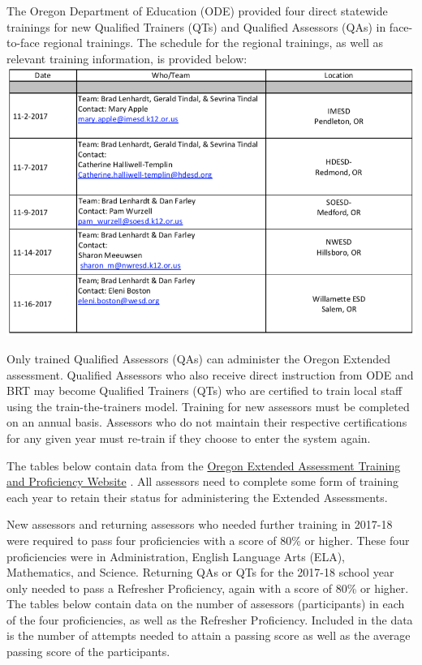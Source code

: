 \documentclass[]{article}
\begin{document}
The Oregon Department of Education (ODE) provided four direct statewide
trainings for new Qualified Trainers (QTs) and Qualified Assessors (QAs)
in face-to-face regional trainings. The schedule for the regional
trainings, as well as relevant training information, is provided below:
\FloatBarrier
\includegraphics{Figures/TrainingSched/TraingSched.png}

Only trained Qualified Assessors (QAs) can administer the Oregon
Extended assessment. Qualified Assessors who also receive direct
instruction from ODE and BRT may become Qualified Trainers (QTs) who are
certified to train local staff using the train-the-trainers model.
Training for new assessors must be completed on an annual basis.
Assessors who do not maintain their respective certifications for any
given year must re-train if they choose to enter the system again.

The tables below contain data from the
\color{link}\href{http://or.k12test.com/}{Oregon Extended Assessment
Training and Proficiency Website} \color{black}. All assessors need to
complete some form of training each year to retain their status for
administering the Extended Assessments.

New assessors and returning assessors who needed further training in
2017-18 were required to pass four proficiencies with a score of 80\% or
higher. These four proficiencies were in Administration, English
Language Arts (ELA), Mathematics, and Science. Returning QAs or QTs for
the 2017-18 school year only needed to pass a Refresher Proficiency,
again with a score of 80\% or higher. The tables below contain data on
the number of assessors (participants) in each of the four
proficiencies, as well as the Refresher Proficiency. Included in the
data is the number of attempts needed to attain a passing score as well
as the average passing score of the participants.
\end{document}
